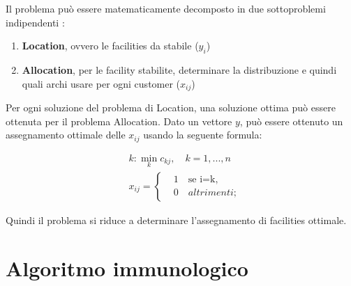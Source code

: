 \documentclass[a4paper,12pt,titlepage,oneside]{article}
\begin{document}
Il problema può essere matematicamente decomposto in due sottoproblemi indipendenti \cite{Sultan1999}:
\begin{enumerate}
\item \textbf{Location}, ovvero le facilities da stabile ($y_{i}$)
\item \textbf{Allocation}, per le facility stabilite, determinare la distribuzione e quindi quali archi usare per ogni customer ($x_{ij}$) 
\end{enumerate}

Per ogni soluzione del problema di Location, una soluzione ottima può essere ottenuta per il problema Allocation. Dato un vettore $y$, può essere ottenuto un assegnamento ottimale delle $x_{ij}$ usando la seguente formula:

\begin{equation*}
\begin{aligned}
& k:\min_{k}c_{kj}, \quad k = 1,...,n \\
& x_{ij}=\left\{\begin{aligned}
& 1 \quad \text{se i=k},\\ 
& 0 \quad altrimenti;
\end{aligned}\right.
\end{aligned}
\end{equation*}

Quindi il problema si riduce a determinare l'assegnamento di facilities ottimale.
\section{Algoritmo immunologico}
\end{document}
